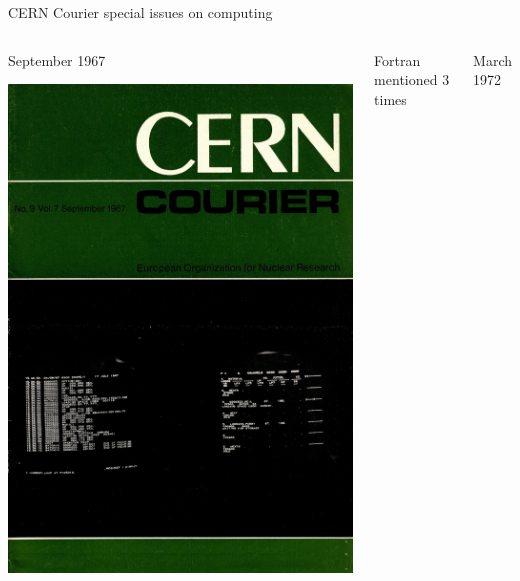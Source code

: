 \documentclass[aspectratio=169]{beamer}
\begin{document}
\begin{frame}{CERN Courier special issues on computing}
\large
\begin{columns}
\begin{center}
September 1967

\vspace{0.2 cm}
\includegraphics[width=\linewidth]{PLOTS/cern-courier-1.png}

\vspace{0.5 cm}
\end{center}

Fortran mentioned 3 times

\begin{center}
March 1972


\end{center}
\end{columns}
\end{frame}
\end{document}
